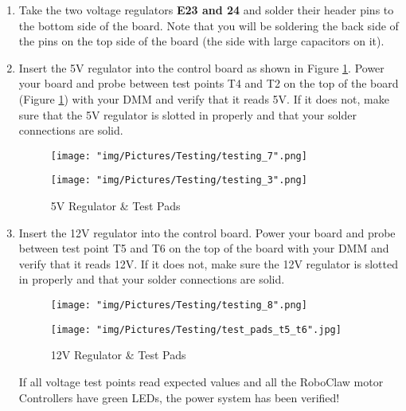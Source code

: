 \documentclass[12pt]{article}
\begin{document}
\begin{enumerate}
\item Take the two voltage regulators \textbf{E23 and 24} and solder their header pins to the bottom side of the board.  Note that you will be soldering the back side of the pins on the top side of the board (the side with large capacitors on it). 

\item Insert the 5V regulator into the control board as shown in Figure \ref{test_5}. Power your board and probe between test points T4 and T2 on the top of the board (Figure \ref{test_5}) with your DMM and verify that it reads 5V. If it does not, make sure that the 5V regulator is slotted in properly and that your solder connections are solid.

\begin{figure}[H]
  \centering
  \begin{minipage}[b]{0.45\textwidth}
    \texttt{[image: "img/Pictures/Testing/testing\_7".png]}
  \end{minipage}
  \hfill
  \begin{minipage}[b]{0.45\textwidth}
    \texttt{[image: "img/Pictures/Testing/testing\_3".png]}
  \end{minipage}
  \caption{5V Regulator \& Test Pads}
  \label{test_5}
\end{figure}

\item Insert the 12V regulator into the control board. Power your board and probe between test point T5 and T6 on the top of the board with your DMM and verify that it reads 12V. If it does not, make sure the 12V regulator is slotted in properly and that your solder connections are solid.

\begin{figure}[H]
  \centering
  \begin{minipage}[b]{0.45\textwidth}
    \texttt{[image: "img/Pictures/Testing/testing\_8".png]}
  \end{minipage}
  \hfill
  \begin{minipage}[b]{0.45\textwidth}
    \texttt{[image: "img/Pictures/Testing/test\_pads\_t5\_t6".jpg]}
  \end{minipage}
  \caption{12V Regulator \& Test Pads}
  \label{test_6}
\end{figure}

If all voltage test points read expected values and all the RoboClaw motor Controllers have green LEDs, the power system has been verified! 

\end{enumerate}
\end{document}
